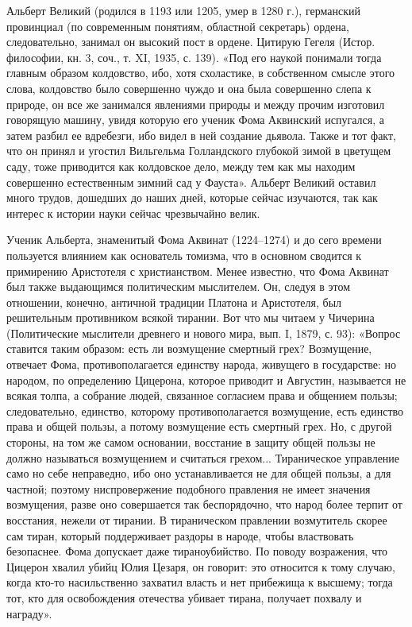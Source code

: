 Альберт Великий (родился в 1193 или 1205, умер в 1280 г.), германский
провинциал (по современным понятиям, областной секретарь) ордена,
следовательно, занимал он высокий пост в ордене. Цитирую Гегеля (Истор.
философии, кн. 3, соч., т. XI, 1935, с. 139). «Под его наукой понимали тогда
главным образом колдовство, ибо, хотя схоластике, в собственном смысле этого
слова, колдовство было совершенно чуждо и она была совершенно слепа к природе,
он все же занимался явлениями природы и между прочим изготовил говорящую
машину, увидя которую его ученик Фома Аквинский испугался, а затем разбил ее
вдребезги, ибо видел в ней создание дьявола. Также и тот факт, что он принял и
угостил Вильгельма Голландского глубокой зимой в цветущем саду, тоже приводится
как колдовское дело, между тем как мы находим совершенно естественным зимний
сад у Фауста». Альберт Великий оставил много трудов, дошедших до наших дней,
которые сейчас изучаются, так как интерес к истории науки сейчас чрезвычайно
велик.

Ученик Альберта, знаменитый Фома Аквинат (1224--1274) и до сего времени
пользуется влиянием как основатель томизма, что в основном сводится к
примирению Аристотеля с христианством. Менее известно, что Фома Аквинат был
также выдающимся политическим мыслителем. Он, следуя в этом отношении, конечно,
античной традиции Платона и Аристотеля, был решительным противником всякой
тирании. Вот что мы читаем у Чичерина (Политические мыслители древнего и нового
мира, вып. I, 1879, с. 93): «Вопрос ставится таким образом: есть ли возмущение
смертный грех? Возмущение, отвечает Фома, противополагается единству народа,
живущего в государстве: но народом, по определению Цицерона, которое приводит и
Августин, называется не всякая толпа, а собрание людей, связанное согласием
права и общением пользы; следовательно, единство, которому противополагается
возмущение, есть единство права и общей пользы, а потому возмущение есть
смертный грех. Но, с другой стороны, на том же самом основании,
восстание в защиту общей пользы не должно называться возмущением и считаться
грехом... Тираническое управление само но себе неправедно, ибо оно
устанавливается не для общей пользы, а для частной; поэтому ниспровержение
подобного правления не имеет значения возмущения, разве оно совершается так
беспорядочно, что народ более терпит от восстания, нежели от тирании. В
тираническом правлении возмутитель скорее сам тиран, который поддерживает
раздоры в народе, чтобы властвовать безопаснее. Фома допускает даже
тираноубийство. По поводу возражения, что Цицерон хвалил убийц Юлия Цезаря, он
говорит: это относится к тому случаю, когда кто-то насильственно захватил
власть и нет прибежища к высшему; тогда тот, кто для освобождения отечества
убивает тирана, получает похвалу и награду».

